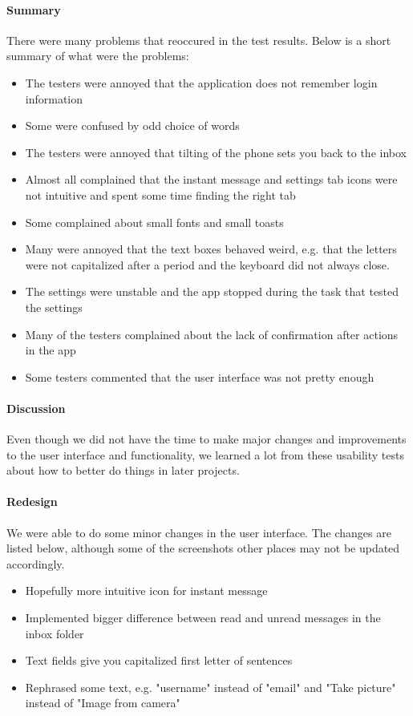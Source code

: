 \paragraph{Summary}\hfill
\newline
			There were many problems that reoccured in the test results. Below is a short summary of what were the problems:
			\begin{itemize}
				\item{}The testers were annoyed that the application does not remember login information
				\item{}Some were confused by odd choice of words
				\item{}The testers were annoyed that tilting of the phone sets you back to the inbox
				\item{}Almost all complained that the instant message and settings tab icons were not intuitive and spent some time finding the right tab
				\item{}Some complained about small fonts and small toasts
				\item{}Many were annoyed that the text boxes behaved weird, e.g. that the letters were not capitalized after a period and the keyboard did not always close.
				\item{}The settings were unstable and the app stopped during the task that tested the settings
				\item{}Many of the testers complained about the lack of confirmation after actions in the app
				\item{}Some testers commented that the user interface was not pretty enough
			\end{itemize}
		\paragraph{Discussion}\hfill
\newline
Even though we did not have the time to make major changes and improvements to the user interface and functionality, we learned a lot from these usability tests about how to better do things in later projects.
		
\paragraph{Redesign}\hfill
\newline
		We were able to do some minor changes in the user interface. The changes are listed below, although some of the screenshots other places may not be updated accordingly.
		\begin{itemize}
			\item{}Hopefully more intuitive icon for instant message
			\item{}Implemented bigger difference between read and unread messages in the inbox folder
			\item{}Text fields give you capitalized first letter of sentences
			\item{}Rephrased some text, e.g. "username" instead of "email" and "Take picture" instead of "Image from camera"
		\end{itemize}


